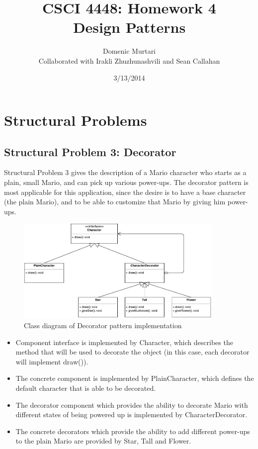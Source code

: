 \documentclass[11pt]{article}
\title{CSCI 4448: Homework 4 \\ Design Patterns}
\author{
  Domenic Murtari \\
  Collaborated with Irakli Zhuzhunashvili and Sean Callahan
}
\date{3/13/2014}
\begin{document}
\maketitle

\newpage

\section{Structural Problems}
\subsection{Structural Problem 3: Decorator}

Structural Problem 3 gives the description of a Mario character who starts as
a plain, small Mario, and can pick up various power-ups. The decorator pattern 
is most applicable for this application, since the desire is to have a base 
character (the plain Mario), and to be able to customize that Mario by giving
him power-ups.

\begin{figure}[!htb]
  \begin{center}
    \includegraphics[width=100mm]{Decorator.pdf}
    \caption{Class diagram of Decorator pattern implementation}
    \label{fig:decorator}
  \end{center} 
\end{figure}

\begin{itemize}
\item Component interface is implemented by {\ttfamily Character}, which 
  describes the method that will be used to decorate the object (in this case,
  each decorator will implement {\ttfamily draw()}).
\item The concrete component is implemented by {\ttfamily PlainCharacter}, which
  defines the default character that is able to be decorated.
\item The decorator component which provides the ability to decorate Mario with
  different states of being powered up is implemented by 
  {\ttfamily CharacterDecorator}.
\item The concrete decorators which provide the ability to add different 
  power-ups to the plain Mario are provided by {\ttfamily Star, Tall} and 
  {\ttfamily Flower}.
\end{itemize}
\end{document}
